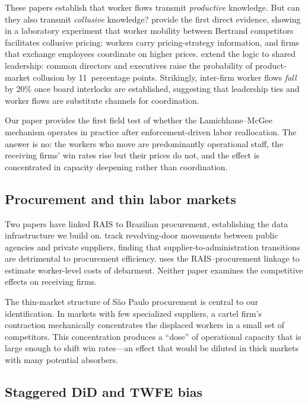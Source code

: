 These papers establish that worker flows transmit \emph{productive} knowledge. But can they also transmit \emph{collusive} knowledge? \citet{lamichhane2024collusion} provide the first direct evidence, showing in a laboratory experiment that worker mobility between Bertrand competitors facilitates collusive pricing: workers carry pricing-strategy information, and firms that exchange employees coordinate on higher prices. \citet{herrera2025collusion} extend the logic to shared leadership: common directors and executives raise the probability of product-market collusion by 11~percentage points. Strikingly, inter-firm worker flows \emph{fall} by 20\% once board interlocks are established, suggesting that leadership ties and worker flows are substitute channels for coordination.

Our paper provides the first field test of whether the Lamichhane--McGee mechanism operates in practice after enforcement-driven labor reallocation. The answer is no: the workers who move are predominantly operational staff, the receiving firms' win rates rise but their prices do not, and the effect is concentrated in capacity deepening rather than coordination.

\subsection{Procurement and thin labor markets}

Two papers have linked RAIS to Brazilian procurement, establishing the data infrastructure we build on. \citet{barbosa2020revolving} track revolving-door movements between public agencies and private suppliers, finding that supplier-to-administration transitions are detrimental to procurement efficiency. \citet{szerman2023employee} uses the RAIS--procurement linkage to estimate worker-level costs of debarment. Neither paper examines the competitive effects on receiving firms.

The thin-market structure of S\~{a}o Paulo procurement is central to our identification. In markets with few specialized suppliers, a cartel firm's contraction mechanically concentrates the displaced workers in a small set of competitors. This concentration produces a ``dose'' of operational capacity that is large enough to shift win rates---an effect that would be diluted in thick markets with many potential absorbers.

\subsection{Staggered DiD and TWFE bias}


